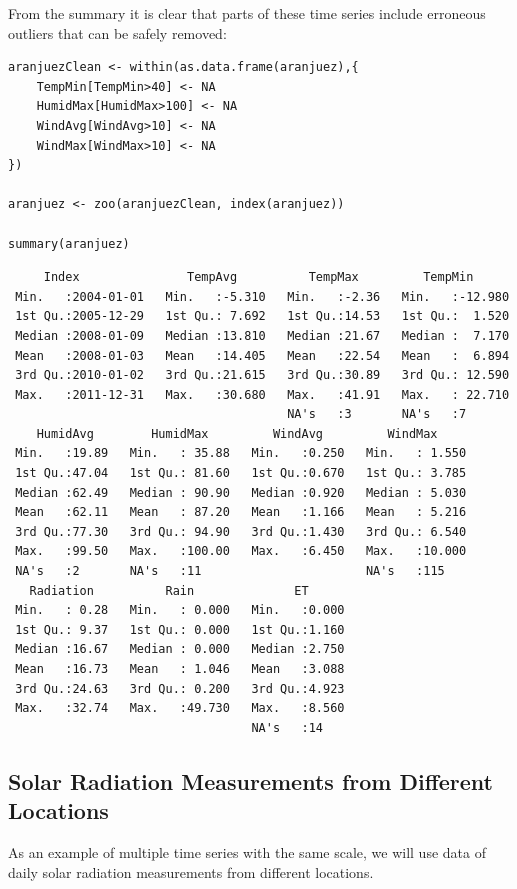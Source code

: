 
From the summary it is clear that parts of these time series include erroneous outliers that can be
safely removed:
\lstset{language=r,label= ,caption= ,captionpos=b,numbers=none}
\begin{lstlisting}
aranjuezClean <- within(as.data.frame(aranjuez),{
    TempMin[TempMin>40] <- NA
    HumidMax[HumidMax>100] <- NA
    WindAvg[WindAvg>10] <- NA
    WindMax[WindMax>10] <- NA
})

aranjuez <- zoo(aranjuezClean, index(aranjuez))

summary(aranjuez)
\end{lstlisting}

\begin{verbatim}
     Index               TempAvg          TempMax         TempMin       
 Min.   :2004-01-01   Min.   :-5.310   Min.   :-2.36   Min.   :-12.980  
 1st Qu.:2005-12-29   1st Qu.: 7.692   1st Qu.:14.53   1st Qu.:  1.520  
 Median :2008-01-09   Median :13.810   Median :21.67   Median :  7.170  
 Mean   :2008-01-03   Mean   :14.405   Mean   :22.54   Mean   :  6.894  
 3rd Qu.:2010-01-02   3rd Qu.:21.615   3rd Qu.:30.89   3rd Qu.: 12.590  
 Max.   :2011-12-31   Max.   :30.680   Max.   :41.91   Max.   : 22.710  
                                       NA's   :3       NA's   :7        
    HumidAvg        HumidMax         WindAvg         WindMax      
 Min.   :19.89   Min.   : 35.88   Min.   :0.250   Min.   : 1.550  
 1st Qu.:47.04   1st Qu.: 81.60   1st Qu.:0.670   1st Qu.: 3.785  
 Median :62.49   Median : 90.90   Median :0.920   Median : 5.030  
 Mean   :62.11   Mean   : 87.20   Mean   :1.166   Mean   : 5.216  
 3rd Qu.:77.30   3rd Qu.: 94.90   3rd Qu.:1.430   3rd Qu.: 6.540  
 Max.   :99.50   Max.   :100.00   Max.   :6.450   Max.   :10.000  
 NA's   :2       NA's   :11                       NA's   :115     
   Radiation          Rain              ET       
 Min.   : 0.28   Min.   : 0.000   Min.   :0.000  
 1st Qu.: 9.37   1st Qu.: 0.000   1st Qu.:1.160  
 Median :16.67   Median : 0.000   Median :2.750  
 Mean   :16.73   Mean   : 1.046   Mean   :3.088  
 3rd Qu.:24.63   3rd Qu.: 0.200   3rd Qu.:4.923  
 Max.   :32.74   Max.   :49.730   Max.   :8.560  
                                  NA's   :14
\end{verbatim}


\subsection{Solar Radiation Measurements from Different Locations}
\label{sec:org3b3fba5}
As an example of multiple time series with the same scale, we will use
data of daily solar radiation measurements from different locations.

